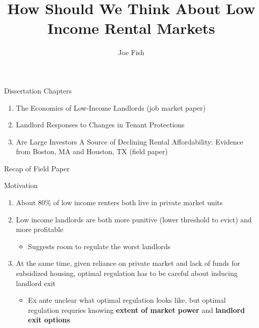 \documentclass[10pt, xcolor=dvipsnames]{beamer}
\date{}
\title[Joe Fish Prospectus]{How Should We Think About Low Income Rental Markets} %
\author[Joe Fish]{Joe Fish}
\begin{document}
\begin{frame}
\titlepage %
\end{frame}

\begin{frame}{Dissertation Chapters}
    \begin{enumerate}
        \item The Economics of Low-Income Landlords (job market paper)
        \item Landlord Responses to Changes in Tenant Protections
        \item Are Large Investors A Source of Declining Rental Affordability: Evidence from Boston, MA and Houston, TX (field paper)
    \end{enumerate}
    
\end{frame}

\begin{frame}{Recap of Field Paper}
    
    
\end{frame}

\begin{frame}{Motivation}
    \begin{enumerate}
        \item About 80\% of low income renters both live in private market units \parencite{jchs_2024, nhpd2024profiles}
        \pause
        \item Low income landlords are both more punitive (lower threshold to evict) and more profitable \parencite{Desmond_2019, Eisfeldt_2015,Damen_2025}
        \begin{itemize}
            \item Suggests room to regulate the worst landlords
        \end{itemize}
        \pause
        \item At the same time, given reliance on private market and lack of funds for subsidized housing, optimal regulation has to be careful about inducing landlord exit
        \begin{itemize}
            \item Ex ante unclear what optimal regulation looks like, but optimal regulation requries knowing \textbf{extent of market power} and \textbf{landlord exit options}
        \end{itemize}
    \end{enumerate}

\end{frame}
\end{document}
